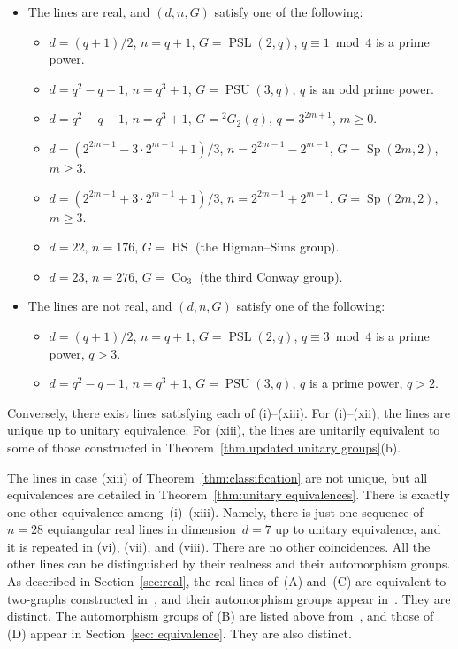 \begin{theorem}
\begin{itemize}
	\begin{itemize}
	\item[(C)]
	The lines are real, and $(d,n,G)$ satisfy one of the following:
		\begin{itemize}
		\item[(v)]
		$d=(q+1)/2$, $n=q+1$, $G=\operatorname{PSL}(2,q)$, $q\equiv1\bmod4$ is a prime power.
		\item[(vi)]
		$d=q^2-q+1$, $n=q^3+1$, $G=\operatorname{PSU}(3,q)$, $q$ is an odd prime power. 
		\item[(vii)]
		$d=q^2-q+1$, $n=q^3+1$, $G={}^2G_2(q)$, $q=3^{2m+1}$, $m \geq 0$.
		\item[(viii)] 
		$d=(2^{2m-1}-3\cdot2^{m-1}+1)/3$, $n=2^{2m-1}-2^{m-1}$, $G=\operatorname{Sp}(2m,2)$, $m\geq3$.
		\item[(ix)]
		$d=(2^{2m-1}+3\cdot2^{m-1}+1)/3$, $n=2^{2m-1}+2^{m-1}$, $G=\operatorname{Sp}(2m,2)$, $m\geq3$.
		\item[(x)]
		$d=22$, $n=176$, $G=\operatorname{HS}$ (the Higman--Sims group).
		\item[(xi)]
		$d=23$, $n=276$, $G=\operatorname{Co}_3$ (the third Conway group).
		\end{itemize}
	
	\item[(D)]
	The lines are not real, and $(d,n,G)$ satisfy one of the following:
		\begin{itemize}
		\item[(xii)]
		$d=(q+1)/2$, $n=q+1$, $G=\operatorname{PSL}(2,q)$, $q\equiv3\bmod4$ is a prime power, $q > 3$.
		\item[(xiii)]
		$d=q^2-q+1$, $n=q^3+1$, $G=\operatorname{PSU}(3,q)$, $q$ is a prime power, $q > 2$.
		\end{itemize}
	\end{itemize}
\end{itemize}
Conversely, there exist lines satisfying each of (i)--(xiii).
For (i)--(xii), the lines are unique up to unitary equivalence.
For (xiii), the lines are unitarily equivalent to some of those constructed in Theorem~\ref{thm.updated unitary groups}(b).
\end{theorem}

\begin{remark}
\label{rem: coincidences}
The lines in case (xiii) of Theorem~\ref{thm:classification} are not unique, but all equivalences are detailed in Theorem~\ref{thm:unitary equivalences}.
There is exactly one other equivalence among~(i)--(xiii).
Namely, there is just one sequence of $n=28$ equiangular real lines in dimension~$d=7$ up to unitary equivalence, and it is repeated in (vi), (vii), and (viii).
There are no other coincidences.
All the other lines can be distinguished by their realness and their automorphism groups.
As described in Section~\ref{sec:real}, the real lines of~(A) and~(C) are equivalent to two-graphs constructed in~\cite{Taylor:77}, and their automorphism groups appear in~\cite{Taylor:92}.
They are distinct.
The automorphism groups of (B) are listed above from~\cite{DempwolffK:23}, and those of (D) appear in Section~\ref{sec: equivalence}.
They are also distinct.
\end{remark}

